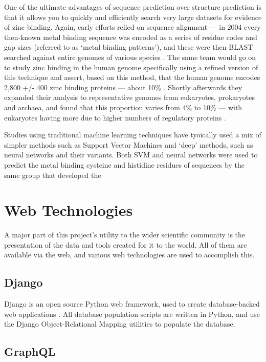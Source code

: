 One of the ultimate advantages of sequence prediction over structure prediction is that it allows you to quickly and efficiently search very large datasets for evidence of zinc binding. Again, early efforts relied on sequence alignment --- in 2004 every then-known metal binding sequence was encoded as a series of residue codes and gap sizes (referred to as `metal binding patterns'), and these were then BLAST searched against entire genomes of various species \cite{andreini2004hint}. The same team would go on to study zinc binding in the human genome specifically using a refined version of this technique and assert, based on this method, that the human genome encodes 2,800 +/- 400 zinc binding proteins --- about 10\% \cite{andreini2006counting}. Shortly afterwards they expanded their analysis to representative genomes from eukaryotes, prokaryotes and archaea, and found that this proportion varies from 4\% to 10\% --- with eukaryotes having more due to higher numbers of regulatory proteins \cite{passerini2007predicting}.

Studies using traditional machine learning techniques have tyoically used a mix of simpler methods such as Support Vector Machines and `deep' methods, such as neural networks and their variants. Both SVM and neural networks were used to predict the metal binding cysteine and histidine residues of sequences by the same group that developed the 

\section{Web Technologies}

A major part of this project's utility to the wider scientific community is the presentation of the data and tools created for it to the world. All of them are available via the web, and various web technologies are used to accomplish this.

\subsection{Django}

Django is an open source Python web framework, used to create database-backed web applications \cite{django}. All database population scripts are written in Python, and use the Django Object-Relational Mapping utilities to populate the database.

\subsection{GraphQL}

